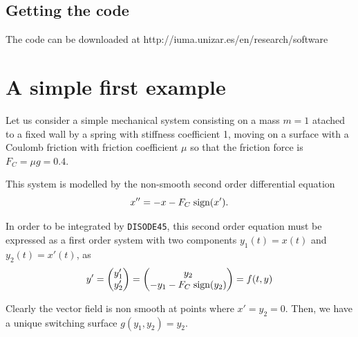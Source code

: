 \documentclass{article}
\begin{document}
\subsection{Getting the code}
The code can be downloaded at http://iuma.unizar.es/en/research/software


\section{A simple first example}

Let us consider a simple mechanical system consisting on a mass $m=1$
atached to a fixed wall by a spring with stiffness coefficient 1, moving on a surface with a Coulomb friction
with friction coefficient $\mu$ so that the friction force is $F_C=\mu g =0.4$.

\medskip

\begin{center}
\end{center}

\medskip

This system is modelled by the non-smooth second order differential equation
\[
x''  = - x - F_C \; \hbox{sign}(x').
\]

In order  to be
integrated by \texttt{DISODE45}, this second order equation must be expressed as a first order system with
two components $y_1(t)=x(t)$ and $y_2(t)=x'(t)$, as
\[
y'=\begin{pmatrix} y_1' \\y_2 '\end{pmatrix}=
\begin{pmatrix} y_2 \\ -y_1 - F_C \; \hbox{sign}(y_2)\end{pmatrix} = f(t,y)
\]

Clearly the vector field is non smooth at points where $x'=y_2=0$. Then, we have a
unique switching surface  $g(y_1,y_2)=y_2$.
\end{document}
